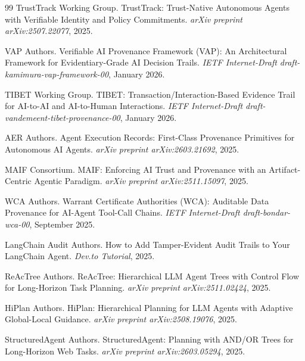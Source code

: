 \begin{thebibliography}{99}
TrustTrack Working Group. \newblock TrustTrack: Trust-Native Autonomous Agents with Verifiable Identity and Policy Commitments.
\newblock \emph{arXiv preprint arXiv:2507.22077}, 2025.

VAP Authors. \newblock Verifiable AI Provenance Framework (VAP): An Architectural Framework for Evidentiary-Grade AI Decision Trails.
\newblock \emph{IETF Internet-Draft draft-kamimura-vap-framework-00}, January 2026.

TIBET Working Group. \newblock TIBET: Transaction/Interaction-Based Evidence Trail for AI-to-AI and AI-to-Human Interactions.
\newblock \emph{IETF Internet-Draft draft-vandemeent-tibet-provenance-00}, January 2026.

AER Authors. \newblock Agent Execution Records: First-Class Provenance Primitives for Autonomous AI Agents.
\newblock \emph{arXiv preprint arXiv:2603.21692}, 2025.

MAIF Consortium. \newblock MAIF: Enforcing AI Trust and Provenance with an Artifact-Centric Agentic Paradigm.
\newblock \emph{arXiv preprint arXiv:2511.15097}, 2025.

WCA Authors. \newblock Warrant Certificate Authorities (WCA): Auditable Data Provenance for AI-Agent Tool-Call Chains.
\newblock \emph{IETF Internet-Draft draft-bondar-wca-00}, September 2025.

LangChain Audit Authors. \newblock How to Add Tamper-Evident Audit Trails to Your LangChain Agent.
\newblock \emph{Dev.to Tutorial}, 2025.

ReAcTree Authors. \newblock ReAcTree: Hierarchical LLM Agent Trees with Control Flow for Long-Horizon Task Planning.
\newblock \emph{arXiv preprint arXiv:2511.02424}, 2025.

HiPlan Authors. \newblock HiPlan: Hierarchical Planning for LLM Agents with Adaptive Global-Local Guidance.
\newblock \emph{arXiv preprint arXiv:2508.19076}, 2025.

StructuredAgent Authors. \newblock StructuredAgent: Planning with AND/OR Trees for Long-Horizon Web Tasks.
\newblock \emph{arXiv preprint arXiv:2603.05294}, 2025.


\end{thebibliography}
